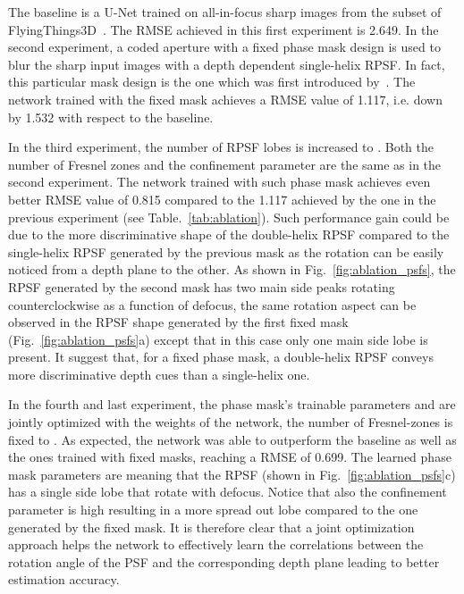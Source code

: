 \documentclass[preprint,5p,twocolumn]{elsarticle}
\begin{document}
The baseline is a U-Net trained on all-in-focus sharp images from the subset of FlyingThings3D~\cite{MIFDB16}. The RMSE achieved in this first experiment is 2.649. In the second experiment, a coded aperture with a fixed phase mask design  is used to blur the sharp input images with a depth dependent single-helix RPSF. In fact, this particular mask design is the one which was first introduced by~\cite{prasad2013rotating}. The network trained with the fixed mask achieves a RMSE value of 1.117, i.e. down by 1.532 with respect to the baseline.

In the third experiment, the number of RPSF lobes is increased to . Both the number of Fresnel zones  and the confinement parameter  are the same as in the second experiment. The network trained with such phase mask achieves even better RMSE value of 0.815 compared to the 1.117 achieved by the one in the previous experiment (see Table.~\ref{tab:ablation}). Such performance gain could be due to the more discriminative shape of the double-helix RPSF compared to the single-helix RPSF generated by the previous mask as the rotation can be easily noticed from a depth plane to the other. As shown in Fig.~\ref{fig:ablation_psfs}, the RPSF generated by the second mask has two main side peaks rotating counterclockwise as a function of defocus, the same rotation aspect can be observed in the RPSF shape generated by the first fixed mask (Fig.~\ref{fig:ablation_psfs}a) except that in this case only one main side lobe is present. It suggest that, for a fixed phase mask, a double-helix RPSF conveys more discriminative depth cues than a single-helix one.

In the fourth and last experiment,  the phase mask's trainable parameters  and  are jointly optimized with the weights of the network, the number of Fresnel-zones is fixed to . As expected, the network was able to outperform the baseline as well as the ones trained with fixed masks, reaching a RMSE of 0.699. The learned phase mask parameters are  meaning that the RPSF (shown in Fig.~\ref{fig:ablation_psfs}c) has a single side lobe that rotate with defocus. Notice that also the confinement parameter  is high resulting in a more spread out lobe compared to the one generated by the fixed mask. It is therefore clear that a joint optimization approach helps the network to effectively learn the correlations between the rotation angle of the PSF and the corresponding depth plane leading to better estimation accuracy.   



%
\end{document}
